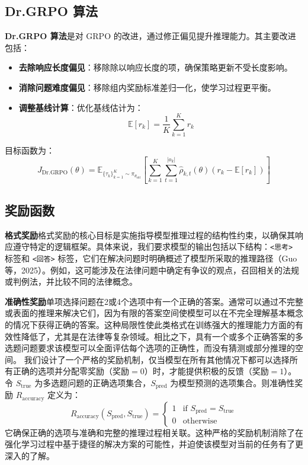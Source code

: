 \documentclass{pkuthesis}
\begin{document}
\subsection{Dr.GRPO 算法}
\textbf{Dr.GRPO 算法}是对 GRPO 的改进，通过修正偏见提升推理能力。其主要改进包括：
\begin{itemize}
    \item \textbf{去除响应长度偏见}：移除除以响应长度的项，确保策略更新不受长度影响。
    \item \textbf{消除问题难度偏见}：移除组内奖励标准差归一化，使学习过程更平衡。
    \item \textbf{调整基线计算}：优化基线估计为：
    \[
    \mathbb{E}[r_k] = \frac{1}{K} \sum_{k=1}^K r_k
    \]
\end{itemize}
目标函数为：
\[
J_{\text{Dr.GRPO}}(\theta) = \mathbb{E}_{\{\tau_k\}_{k=1}^K \sim \pi_{\theta_{\text{old}}}}\left[\sum_{k=1}^{K} \sum_{t=1}^{|o_k|} \hat{\rho}_{k,t}(\theta) (r_k - \mathbb{E}[r_k])\right]
\]


\subsection{奖励函数}
\textbf{格式奖励}格式奖励的核心目标是实施指导模型推理过程的结构性约束，以确保其响应遵守特定的逻辑框架。具体来说，我们要求模型的输出包括以下结构：\texttt{<思考>} 标签和 \texttt{<回答>} 标签，它们在解决问题时明确概述了模型所采取的推理路径（Guo等，2025）。例如，这可能涉及在法律问题中确定有争议的观点，召回相关的法规或判例法，并比较不同的法律概念。

\textbf{准确性奖励}单项选择问题在2或4个选项中有一个正确的答案。通常可以通过不完整或表面的推理来解决它们，因为有限的答案空间使模型可以在不完全理解基本概念的情况下获得正确的答案。这种局限性使此类格式在训练强大的推理能力方面的有效性降低了，尤其是在法律等复杂领域。相比之下，具有一个或多个正确答案的多选题问题要求该模型可以全面评估每个选项的正确性，而没有猜测或部分推理的空间。
我们设计了一个严格的奖励机制，仅当模型在所有其他情况下都可以选择所有正确的选项并分配零奖励（奖励$=0$）时，才能提供积极的反馈（奖励$=1$）。令 $S_{\text{true}}$ 为多选题问题的正确选项集合，$S_{\text{pred}}$ 为模型预测的选项集合。则准确性奖励 $R_{\text{accuracy}}$ 定义为：
$$ R_{\text{accuracy}}(S_{\text{pred}}, S_{\text{true}}) = \begin{cases} 1 & \text{if } S_{\text{pred}} = S_{\text{true}} \\ 0 & \text{otherwise} \end{cases} $$
它确保正确的选项与准确和完整的推理过程相关联。这种严格的奖励机制消除了在强化学习过程中基于捷径的解决方案的可能性，并迫使该模型对当前的任务有了更深入的了解。
\end{document}
